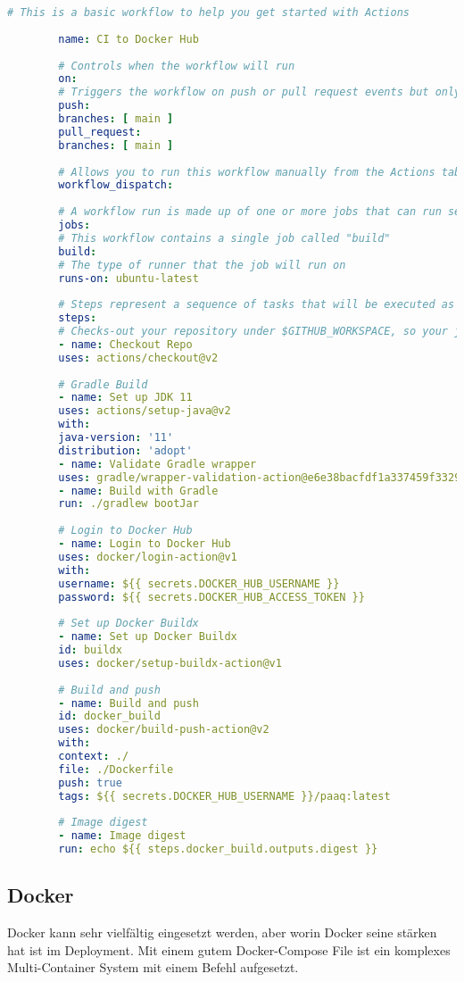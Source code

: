 \documentclass[../main.tex]{subfiles}
\begin{document}
	\begin{lstlisting}[language=yaml]
		# This is a basic workflow to help you get started with Actions
		
		name: CI to Docker Hub
		
		# Controls when the workflow will run
		on:
		# Triggers the workflow on push or pull request events but only for the main branch
		push:
		branches: [ main ]
		pull_request:
		branches: [ main ]
		
		# Allows you to run this workflow manually from the Actions tab
		workflow_dispatch:
		
		# A workflow run is made up of one or more jobs that can run sequentially or in parallel
		jobs:
		# This workflow contains a single job called "build"
		build:
		# The type of runner that the job will run on
		runs-on: ubuntu-latest
		
		# Steps represent a sequence of tasks that will be executed as part of the job
		steps:
		# Checks-out your repository under $GITHUB_WORKSPACE, so your job can access it
		- name: Checkout Repo
		uses: actions/checkout@v2
		
		# Gradle Build
		- name: Set up JDK 11
		uses: actions/setup-java@v2
		with:
		java-version: '11'
		distribution: 'adopt'
		- name: Validate Gradle wrapper
		uses: gradle/wrapper-validation-action@e6e38bacfdf1a337459f332974bb2327a31aaf4b
		- name: Build with Gradle
		run: ./gradlew bootJar
		
		# Login to Docker Hub
		- name: Login to Docker Hub
		uses: docker/login-action@v1
		with:
		username: ${{ secrets.DOCKER_HUB_USERNAME }}
		password: ${{ secrets.DOCKER_HUB_ACCESS_TOKEN }}
		
		# Set up Docker Buildx
		- name: Set up Docker Buildx
		id: buildx
		uses: docker/setup-buildx-action@v1
		
		# Build and push
		- name: Build and push
		id: docker_build
		uses: docker/build-push-action@v2
		with:
		context: ./
		file: ./Dockerfile
		push: true
		tags: ${{ secrets.DOCKER_HUB_USERNAME }}/paaq:latest
		
		# Image digest
		- name: Image digest
		run: echo ${{ steps.docker_build.outputs.digest }}
	\end{lstlisting}
	
	\subsection{Docker}
	Docker kann sehr vielfältig eingesetzt werden, aber worin Docker seine stärken hat ist im Deployment. Mit einem gutem Docker-Compose File ist ein komplexes Multi-Container System mit einem Befehl aufgesetzt.
	
\end{document}
